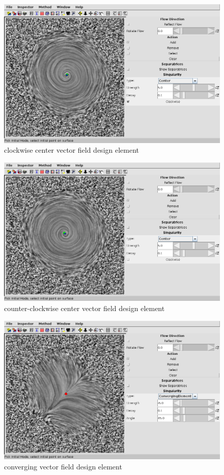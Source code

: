 \documentclass[a4paper,10pt,notitlepage]{scrreprt}
\begin{document}
\begin{figure}
  \centering
  \includegraphics[scale=0.5]{img-3-2/center-cw.png}
  \caption{clockwise center vector field design element}
  \label{fig:center-cw}
\end{figure}

\begin{figure}
  \centering
  \includegraphics[scale=0.5]{img-3-2/center-cc.png}
  \caption{counter-clockwise center vector field design element}
  \label{fig:center-cc}
\end{figure}

\begin{figure}
  \centering
  \includegraphics[scale=0.5]{img-3-2/converging.png}
  \caption{converging vector field design element}
  \label{fig:converging}
\end{figure}
\end{document}

